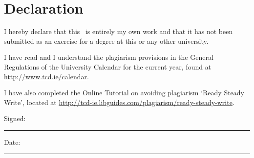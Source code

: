 \chapter*{Declaration}

I hereby declare that this \typeofthesis\ is entirely my own work and that it has not been submitted as an exercise for a degree at this or any other university.

I have read and I understand the plagiarism provisions in the General Regulations of the University Calendar for the current year, found at \url{http://www.tcd.ie/calendar}.

I have also completed the Online Tutorial on avoiding plagiarism `Ready Steady Write', located at \url{http://tcd-ie.libguides.com/plagiarism/ready-steady-write}.

\vspace{1.5cm}

Signed:~\rule{5cm}{0.3pt}\hfill Date:~\rule{5cm}{0.3pt}
